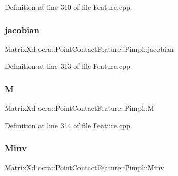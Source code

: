 Definition at line 310 of file Feature.\+cpp.

\hypertarget{structocra_1_1PointContactFeature_1_1Pimpl_a324288a2a8620b723b27d8e4d0c54a79}{}\label{structocra_1_1PointContactFeature_1_1Pimpl_a324288a2a8620b723b27d8e4d0c54a79} 
\subsubsection{\texorpdfstring{jacobian}{jacobian}}
{\footnotesize\ttfamily Matrix\+Xd ocra\+::\+Point\+Contact\+Feature\+::\+Pimpl\+::jacobian}



Definition at line 313 of file Feature.\+cpp.

\hypertarget{structocra_1_1PointContactFeature_1_1Pimpl_aa282b2bf576f7d24103a24ffbafba657}{}\label{structocra_1_1PointContactFeature_1_1Pimpl_aa282b2bf576f7d24103a24ffbafba657} 
\subsubsection{\texorpdfstring{M}{M}}
{\footnotesize\ttfamily Matrix\+Xd ocra\+::\+Point\+Contact\+Feature\+::\+Pimpl\+::M}



Definition at line 314 of file Feature.\+cpp.

\hypertarget{structocra_1_1PointContactFeature_1_1Pimpl_a2dfc0e883abbf6c22aace78df3677bb7}{}\label{structocra_1_1PointContactFeature_1_1Pimpl_a2dfc0e883abbf6c22aace78df3677bb7} 
\subsubsection{\texorpdfstring{Minv}{Minv}}
{\footnotesize\ttfamily Matrix\+Xd ocra\+::\+Point\+Contact\+Feature\+::\+Pimpl\+::\+Minv}



